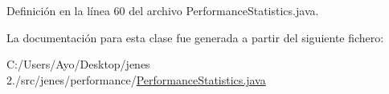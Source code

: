 Definición en la línea 60 del archivo Performance\-Statistics.\-java.



La documentación para esta clase fue generada a partir del siguiente fichero\-:\begin{DoxyCompactItemize}
\item 
C\-:/\-Users/\-Ayo/\-Desktop/jenes 2./src/jenes/performance/\hyperlink{_performance_statistics_8java}{Performance\-Statistics.\-java}\end{DoxyCompactItemize}
